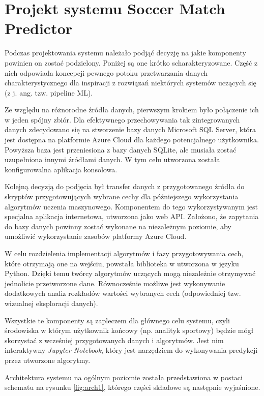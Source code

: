 \chapter{Projekt systemu Soccer Match Predictor}

\noindent Podczas projektowania systemu należało podjąć decyzję na jakie komponenty powinien on zostać podzielony. Poniżej są one krótko scharakteryzowane. Część z nich odpowiada koncepcji pewnego potoku przetwarzania danych charakterystycznego dla inspiracji z rozwiązań niektórych systemów uczących się (z j. ang. tzw. pipeline ML).

Ze względu na różnorodne źródła danych, pierwszym krokiem było połączenie ich w jeden spójny zbiór. Dla efektywnego przechowywania tak zintegrowanych danych zdecydowano się na stworzenie bazy danych Microsoft SQL Server, która jest dostępna na platformie Azure Cloud dla każdego potencjalnego użytkownika. Powyższa baza jest przeniesiona z bazy danych SQLite, ale musiała zostać uzupełniona innymi źródłami danych. W tym celu utworzona została konfigurowalna aplikacja konsolowa.

Kolejną decyzją do podjęcia był transfer danych z przygotowanego źródła do skryptów przygotowujących wybrane cechy dla późniejszego wykorzystania algorytmów uczenia maszynowego. Komponentem do tego wykorzystywanym jest specjalna aplikacja internetowa, utworzona jako web API. Założono, że zapytania do bazy danych powinny zostać wykonane na niezależnym poziomie, aby umożliwić wykorzystanie zasobów platformy Azure Cloud.

W celu rozdzielenia implementacji algorytmów i fazy przygotowywania cech, które otrzymają one na wejściu, powstała biblioteka w utworzona w języku Python. Dzięki temu twórcy algorytmów uczących mogą niezależnie otrzymywać jednolicie przetworzone dane. Równocześnie możliwe jest wykonywanie dodatkowych analiz rozkładów wartości wybranych cech (odpowiedniej tzw. wizualnej eksploracji danych).

Wszystkie te komponenty są zapleczem dla głównego celu systemu, czyli środowiska w którym użytkownik końcowy (np. analityk sportowy) będzie mógł skorzystać z wcześniej przygotowanych danych i algorytmów. Jest nim interaktywny \textit{Jupyter Notebook}, który jest narzędziem do wykonywania predykcji przez utworzone algorytmy.

Architektura systemu na ogólnym poziomie została przedstawiona w postaci schematu na rysunku \ref{fig:arch1}, którego części składowe są następnie wyjaśnione.
\newpage

